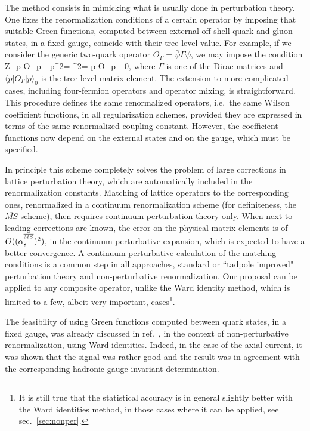 The method consists in  mimicking  what is usually done in perturbation
theory.
One fixes the renormalization conditions of a
certain operator by imposing that suitable Green functions, computed
between external off-shell quark and gluon states, in a fixed gauge,
coincide with their tree level value. For example, if we consider
the generic two-quark operator $O_\Gamma= \bar \psi \Gamma \psi$,
we may impose the condition
\beq Z_\Gamma \langle p \vert O_\Gamma \vert p \rangle\vert_{p^2=-\mu^2}=
\langle p \vert O_\Gamma \vert p \rangle_0, \eeq
where $\Gamma$ is one of the Dirac matrices and $
\langle p \vert O_\Gamma \vert p \rangle_0$ is the tree level matrix element.
The extension to more complicated cases, including four-fermion operators
and operator mixing, is straightforward.
This procedure defines the same renormalized operators, i.e.\ the same
Wilson coefficient functions, in all  regularization schemes,
 provided they are expressed in terms of the same renormalized
coupling constant. However, the coefficient functions now depend on
the external states and on the gauge, which must be specified.

In principle this scheme completely solves
the problem of  large corrections in lattice perturbation theory,
 which are automatically
included in the renormalization constants.
Matching of  lattice operators to
the corresponding ones, renormalized in a
continuum renormalization scheme (for definiteness, the $\overline{MS}$
scheme),
then requires continuum perturbation theory only.
When  next-to-leading corrections are known, the error
on the physical matrix elements is of  $O((\alpha_s^{{}^{\overline{MS}}})^2)$, in the continuum
perturbative expansion, which is expected to have a better convergence.
A continuum perturbative calculation of the matching conditions
 is a common step in  all approaches, standard or
 ``tadpole improved" perturbation theory and non-perturbative
renormalization.
Our proposal  can be applied to any composite operator,
unlike the  Ward identity method, which
 is limited to a few, albeit very important, cases\footnote
{It is still true that the statistical
accuracy is in general slightly better with the Ward identities
method, in those cases
where it can be applied, see sec.\ \ref{sec:nonper}.}.

The feasibility of using Green functions computed between
 quark states,
in a fixed gauge, was already discussed in ref.\ \cite{wi}, in the context
of non-perturbative renormalization, using Ward identities. Indeed, in the case
of the axial current, it was shown
that the signal was rather good and the result was in agreement with the
corresponding hadronic gauge invariant determination.

